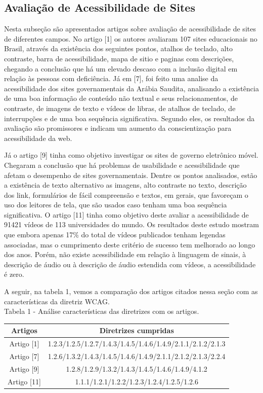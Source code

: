 \documentclass[a4paper]{article}
\begin{document}
\begin{titlepage}
\subsection{Avaliação de Acessibilidade de Sites}
Nesta subseção são apresentados artigos sobre avaliação de acessibilidade de sites de diferentes campos.  No artigo [1] os autores avaliaram 107 sites educacionais no Brasil, através da existência dos seguintes pontos, atalhos de teclado, alto contraste, barra de acessibilidade, mapa de sitio e paginas com descrições, chegando a conclusão que há um elevado descaso com a inclusão digital em relação às pessoas com deficiência. Já em [7], foi feito uma analise da acessibilidade dos sites governamentais da Arábia Saudita, analisando a existência de uma boa informação de conteúdo não textual e seus relacionamentos, de contraste, de imagens de texto e vídeos de libras, de atalhos de teclado, de interrupções e de uma boa sequência significativa. Segundo eles, os resultados da avaliação são promissores e indicam um aumento da conscientização para acessibilidade da web.

Já o artigo [9] tinha como objetivo investigar os sites de governo eletrônico móvel. Chegaram a conclusão que há problemas de usabilidade e acessibilidade que afetam o desempenho de sites governamentais. Dentre os pontos analisados, estão a existência de texto alternativo as imagens, alto contraste no texto, descrição dos link, formulários de fácil compreensão e textos, em gerais, que favoreçam o uso dos leitores de tela, que são usados caso tenham uma boa sequência significativa. O artigo [11] tinha como objetivo deste avaliar a acessibilidade de 91421 vídeos de 113 universidades do mundo. Os resultados deste estudo mostram que embora apenas 17\% do total de vídeos publicados tenham legendas associadas, mas o cumprimento deste critério de sucesso tem melhorado ao longo dos anos. Porém, não existe acessibilidade em relação à linguagem de sinais, à descrição de áudio ou à descrição de áudio estendida com vídeos, a acessibilidade é zero.

A seguir, na tabela 1, vemos a comparação dos artigos citados nessa seção com as características da diretriz WCAG.\\

Tabela 1 - Análise características das diretrizes com os artigos.
\begin{center}
	\begin{tabular}{cc}
		\hline
		Artigos & Diretrizes cumpridas\\
		\hline
		Artigo [1] & 1.2.3/1.2.5/1.2.7/1.4.3/1.4.5/1.4.6/1.4.9/2.1.1/2.1.2/2.1.3\\
		Artigo [7] & 1.2.6/1.3.2/1.4.3/1.4.5/1.4.6/1.4.9/2.1.1/2.1.2/2.1.3/2.2.4\\
		Artigo [9] & 1.2.8/1.2.9/1.3.2/1.4.3/1.4.5/1.4.6/1.4.9/4.1.2\\
		Artigo [11] & 1.1.1/1.2.1/1.2.2/1.2.3/1.2.4/1.2.5/1.2.6\\
		\hline
	\end{tabular}
\end{center}


\end{titlepage}
\end{document}
